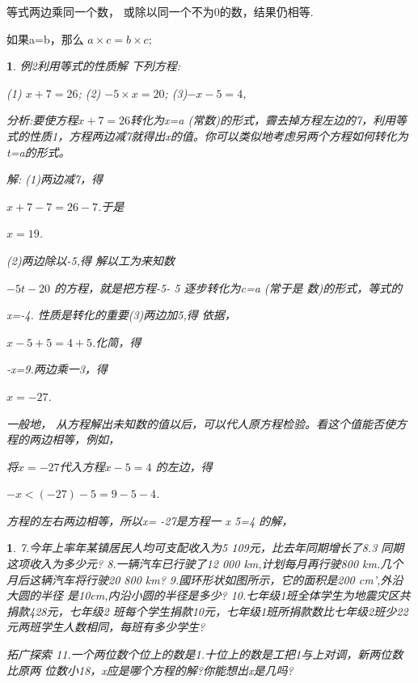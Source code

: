 \documentclass[11pt]{article}
\newtheorem{exercise}{ }
\newtheorem{example}{ }
\begin{document}
	\begin{propertory}
等式两边乘同一个数， 或除以同一个不为0的数，结果仍相等.

如果a=b，那么 $a \times c=b \times c$;\\
	\begin{propertory}


\begin{example}

例2利用等式的性质解 下列方程:

(1) $x+7=26$;  (2) $-5 \times x=20$;  (3)$-x-5=4$,

分析:要使方程$x+7=26$转化为x=a (常数)的形式，霽去掉方程左边的7，利用等式的性质1，方程两边减7就得出x的值。你可以类似地考虑另两个方程如何转化为t=a的形式。

解: (1)两边减7，得

$x+7-7=26-7$.于是

$x=19$.

(2)两边除以-5,得  解以工为来知数

$-5t-20$  的方程，就是把方程-5- 5  逐步转化为c=a (常于是  数)的形式，等式的

x=-4.  性质是转化的重要(3)两边加5,得  依据，

$x-5+5=4+5$.化简，得

-x=9.两边乘一3，得

$x=-27$.

一般地， 从方程解出未知数的值以后，可以代人原方程检验。看这个值能否使方程的两边相等，例如，

将$x=-27$代入方程$x-5=4$ 的左边，得

$-x<(-27)-5=9-5-4$.

方程的左右两边相等，所以x= -27是方程一 x 5=4 的解，
\end{example}

\begin{exercise}
7.今年上率年某镇居民人均可支配收入为5 109元，比去年同期增长了8.3%
同期这项收入为多少元?
8.一辆汽车已行驶了12 000 km,计划每月再行驶800 km.几个
月后这辆汽车将行驶20 800 km?
9.國环形状如图所示，它的面积是200 cm',外沿大圆的半径
是10cm,内沿小圆的半径是多少?
10.七年级1班全体学生为地震灾区共捐款428元，七年级2
班每个学生捐款10元，七年级1班所捐款数比七年级2班少22元两班学生人数相同，每班有多少学生?

拓广探索
11.一个两位数个位上的数是1.十位上的数是工把1与上对调，新两位数比原两
位数小18，x应是哪个方程的解?你能想出x是几吗?
\end{exercise}


\end{propertory}
\end{propertory}
\end{document}
